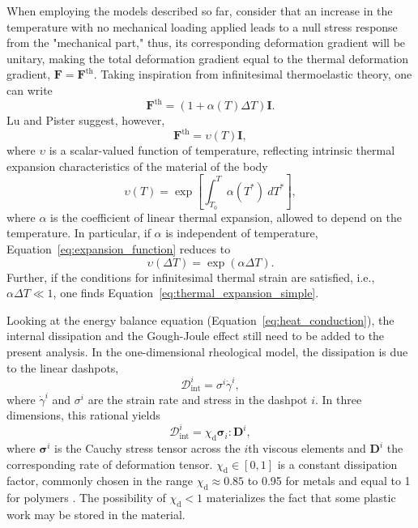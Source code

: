When employing the models described so far, consider that an increase in the temperature with no mechanical loading applied leads to a null stress response from the "mechanical part," thus, its corresponding deformation gradient will be unitary, making the total deformation gradient equal to the thermal deformation gradient, $\bm F = \bm F^\text{th}$.
Taking inspiration from infinitesimal thermoelastic theory, one can write
\begin{equation}
	\label{eq:thermal_expansion_simple}
	\bm F^\text{th} = (1 + \alpha(T)\Delta T)\bm I.
\end{equation}
Lu and Pister \citep{luDecompositionDeformationRepresentation1975} suggest, however,
\begin{equation}
	\bm F^\text{th} = \upsilon(T)\bm I,
\end{equation}
where $\upsilon$ is a scalar-valued function of temperature, reflecting intrinsic thermal expansion characteristics of the material of the body
\begin{equation}
	\label{eq:expansion_function}
	\upsilon(T) = \exp\left[\int_{T_0}^T \alpha(T^*)\ dT^*\right],
\end{equation}
where $\alpha$ is the coefficient of linear thermal expansion, allowed to depend on the temperature.
In particular, if $\alpha$ is independent of temperature, Equation~\eqref{eq:expansion_function} reduces to
\begin{equation}
	\upsilon(\Delta T) = \exp(\alpha \Delta T).
\end{equation}
Further, if the conditions for infinitesimal thermal strain are satisfied, i.e., $\alpha\Delta T \ll 1$, one finds Equation~\eqref{eq:thermal_expansion_simple}.

Looking at the energy balance equation (Equation~\eqref{eq:heat_conduction}), the internal dissipation and the Gough-Joule effect still need to be added to the present analysis.
In the one-dimensional rheological model, the dissipation is due to the linear dashpots,
\begin{equation}
	\mathcal D^i_\text{int} = \sigma^i {\dot\gamma}^i,
\end{equation}
where ${\dot \gamma}^i$ and $\sigma^i$ are the strain rate and stress in the dashpot $i$.
In three dimensions, this rational yields
\begin{equation}
	\mathcal D_\text{int}^i = \chi_\text{d}\bm \sigma_i : \bm D^i,
\end{equation}
where $\bm \sigma^i$ is the Cauchy stress tensor across the $i$th viscous elements and $\bm D^i$ the corresponding rate of deformation tensor.
$\chi_\text{d}\in [0, 1]$ is a constant dissipation factor, commonly chosen in the range $\chi_\text{d}\approx 0.85$ to 0.95 for metals \citep{simoAssociativeCoupledThermoplasticity1992} and equal to 1 for polymers \citep{okerekeTwoprocessConstitutiveModel2019, haoRatedependentConstitutiveModel2022}.
The possibility of $\chi_\text{d}<1$ materializes the fact that some plastic work may be stored in the material.

